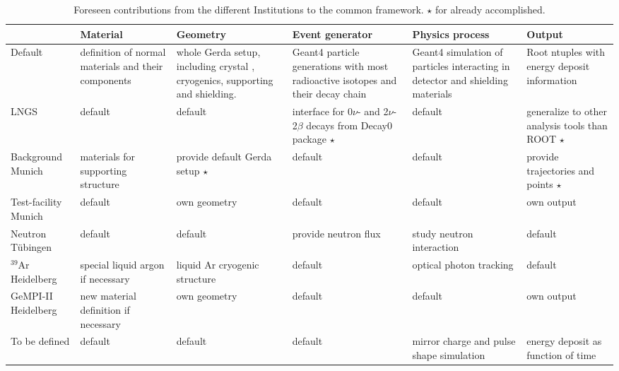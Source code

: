 \documentclass[a4paper,12pt,twoside]{article}
\begin{document}
\begin{landscape}
\begin{table}[tb]
\begin{center}
\begin{tabular}{|m{2.5cm}||m{3.2cm}|m{3.2cm}|m{3.2cm}|m{3.2cm}|m{3.2cm}|}
\hline
     & Material & Geometry & Event generator & Physics process
     & Output   \\ \hline\hline
Default             & definition of normal materials and their components
                    & whole Gerda setup, 
               including crystal , cryogenics, supporting and shielding.
                    & Geant4 particle generations with most
                      radioactive isotopes and their decay chain
                    & Geant4 simulation of particles interacting
                      in detector and shielding materials
                    & Root ntuples with energy deposit information \\ \hline
LNGS                & default & default
                    & interface for 0$\nu$- and 2$\nu$- 2$\beta$ 
                      decays from Decay0 package $\star$
                    & default & generalize to other analysis tools than ROOT $\star$ \\ 
\hline
Background Munich   & materials for supporting structure
                    & provide default Gerda setup $\star$
                    & default & default 
                    & provide trajectories and points $\star$ \\ \hline
Test-facility Munich & default
                    & own geometry
                    & default & default & own output \\ \hline
Neutron T\"{u}bingen& default      & default
                    & provide neutron flux 
                    & study neutron interaction
                    & default         \\ \hline
$^{39}$Ar Heidelberg     & special liquid argon if necessary
                    & liquid Ar cryogenic structure
                    & default      & optical photon tracking
                    & default         \\ \hline
GeMPI-II Heidelberg & new material definition if necessary &  own geometry
                    & default      & default
                    & own output      \\ \hline
To be defined                 & default      & default
                    & default      & mirror charge and pulse shape simulation
                    & energy deposit as function of time   \\ \hline
\end{tabular}
\caption{Foreseen contributions from the different Institutions to the common
framework. $\star$ for already accomplished.} \label{needs_table}
\end{center}
\end{table}
\end{landscape}
\end{document}
